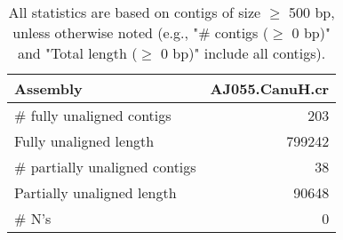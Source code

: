 \documentclass[12pt,a4paper]{article}
\begin{document}
\begin{table}[ht]
\begin{center}
\caption{All statistics are based on contigs of size $\geq$ 500 bp, unless otherwise noted (e.g., "\# contigs ($\geq$ 0 bp)" and "Total length ($\geq$ 0 bp)" include all contigs).}
\begin{tabular}{|l*{1}{|r}|}
\hline
Assembly & AJ055.CanuH.cr \\ \hline
\# fully unaligned contigs & 203 \\ \hline
Fully unaligned length & 799242 \\ \hline
\# partially unaligned contigs & 38 \\ \hline
Partially unaligned length & 90648 \\ \hline
\# N's & 0 \\ \hline
\end{tabular}
\end{center}
\end{table}
\end{document}
